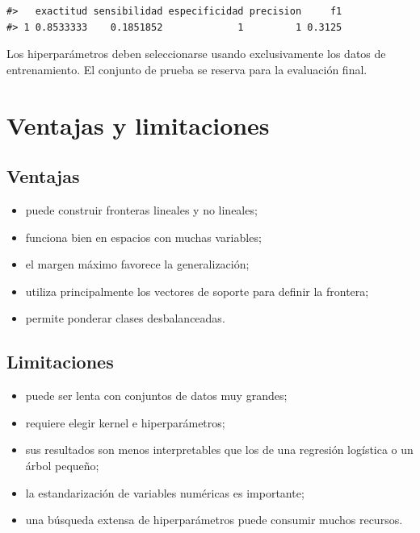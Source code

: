 \documentclass[
  spanish,
  10.5pt,
  letterpaper,
  openany,
  headings=big]{scrbook}
\providecommand{\tightlist}{%
  \setlength{\itemsep}{0pt}\setlength{\parskip}{0pt}}
\begin{document}
\begin{verbatim}
#>   exactitud sensibilidad especificidad precision     f1
#> 1 0.8533333    0.1851852             1         1 0.3125
\end{verbatim}

\begin{tcolorbox}[enhanced jigsaw, arc=.35mm, bottomrule=.15mm, bottomtitle=1mm, breakable, colback=white, colbacktitle=quarto-callout-warning-color!10!white, colframe=quarto-callout-warning-color-frame, coltitle=black, left=2mm, leftrule=.75mm, opacityback=0, opacitybacktitle=0.6, rightrule=.15mm, title=\textcolor{quarto-callout-warning-color}{\faExclamationTriangle}\hspace{0.5em}{Validación sin fuga de información}, titlerule=0mm, toprule=.15mm, toptitle=1mm]

Los hiperparámetros deben seleccionarse usando exclusivamente los datos
de entrenamiento. El conjunto de prueba se reserva para la evaluación
final.

\end{tcolorbox}

\section{Ventajas y limitaciones}\label{ventajas-y-limitaciones}

\subsection{Ventajas}\label{ventajas}

\begin{itemize}
\tightlist
\item
  puede construir fronteras lineales y no lineales;
\item
  funciona bien en espacios con muchas variables;
\item
  el margen máximo favorece la generalización;
\item
  utiliza principalmente los vectores de soporte para definir la
  frontera;
\item
  permite ponderar clases desbalanceadas.
\end{itemize}

\subsection{Limitaciones}\label{limitaciones}

\begin{itemize}
\tightlist
\item
  puede ser lenta con conjuntos de datos muy grandes;
\item
  requiere elegir kernel e hiperparámetros;
\item
  sus resultados son menos interpretables que los de una regresión
  logística o un árbol pequeño;
\item
  la estandarización de variables numéricas es importante;
\item
  una búsqueda extensa de hiperparámetros puede consumir muchos
  recursos.
\end{itemize}
\end{document}
